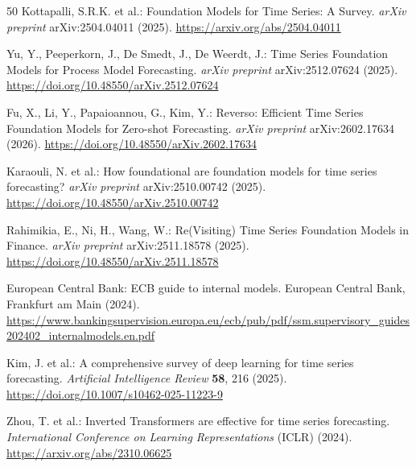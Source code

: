 \documentclass[sn-mathphys-num,pdflatex]{sn-jnl}
\begin{document}
\begin{thebibliography}{50}
Kottapalli, S.R.K. et al.:
Foundation Models for Time Series: A Survey.
\textit{arXiv preprint} arXiv:2504.04011 (2025).
\url{https://arxiv.org/abs/2504.04011}

Yu, Y., Peeperkorn, J., De Smedt, J., De Weerdt, J.:
Time Series Foundation Models for Process Model Forecasting.
\textit{arXiv preprint} arXiv:2512.07624 (2025).
\url{https://doi.org/10.48550/arXiv.2512.07624}

Fu, X., Li, Y., Papaioannou, G., Kim, Y.:
Reverso: Efficient Time Series Foundation Models for Zero-shot Forecasting.
\textit{arXiv preprint} arXiv:2602.17634 (2026).
\url{https://doi.org/10.48550/arXiv.2602.17634}

Karaouli, N. et al.:
How foundational are foundation models for time series forecasting?
\textit{arXiv preprint} arXiv:2510.00742 (2025).
\url{https://doi.org/10.48550/arXiv.2510.00742}

Rahimikia, E., Ni, H., Wang, W.:
Re(Visiting) Time Series Foundation Models in Finance.
\textit{arXiv preprint} arXiv:2511.18578 (2025).
\url{https://doi.org/10.48550/arXiv.2511.18578}

European Central Bank:
ECB guide to internal models.
European Central Bank, Frankfurt am Main (2024).
\url{https://www.bankingsupervision.europa.eu/ecb/pub/pdf/ssm.supervisory_guides202402_internalmodels.en.pdf}

Kim, J. et al.:
A comprehensive survey of deep learning for time series forecasting.
\textit{Artificial Intelligence Review} \textbf{58}, 216 (2025).
\url{https://doi.org/10.1007/s10462-025-11223-9}

Zhou, T. et al.:
Inverted Transformers are effective for time series forecasting.
\textit{International Conference on Learning Representations} (ICLR) (2024).
\url{https://arxiv.org/abs/2310.06625}

\end{thebibliography}
\end{document}
